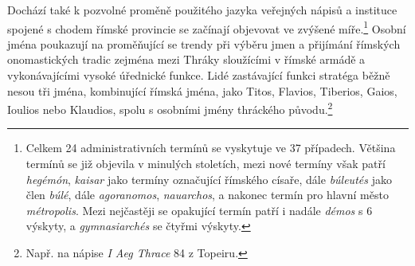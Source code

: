 Dochází také k pozvolné proměně použitého jazyka veřejných nápisů a instituce spojené s chodem římské provincie se začínají objevovat ve zvýšené míře.\footnote{Celkem 24 administrativních termínů se vyskytuje ve 37 případech. Většina termínů se již objevila v minulých stoletích, mezi nové termíny však patří {\em hegémón}, {\em kaisar} jako termíny označující římského císaře, dále {\em búleutés} jako člen {\em búlé}, dále {\em agoranomos}, {\em nauarchos}, a nakonec termín pro hlavní město {\em métropolis}. Mezi nejčastěji se opakující termín patří i nadále {\em démos} s 6 výskyty, a {\em gymnasiarchés} se čtyřmi výskyty.} Osobní jména poukazují na proměňující se trendy při výběru jmen a přijímání římských onomastických tradic zejména mezi Thráky sloužícími v římské armádě a vykonávajícími vysoké úřednické funkce. Lidé zastávající funkci stratéga běžně nesou tři jména, kombinující římská jména, jako Titos, Flavios, Tiberios, Gaios, Ioulios nebo Klaudios, spolu s osobními jmény thráckého původu.\footnote{Např. na nápise {\em I Aeg Thrace} 84 z Topeiru.}

